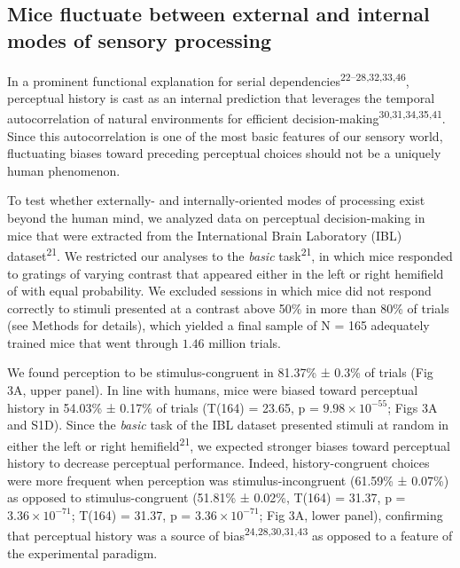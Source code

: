 \documentclass[
]{article}
\begin{document}
\hypertarget{mice-fluctuate-between-external-and-internal-modes-of-sensory-processing}{%
\subsection{Mice fluctuate between external and internal modes of
sensory
processing}\label{mice-fluctuate-between-external-and-internal-modes-of-sensory-processing}}

In a prominent functional explanation for serial
dependencies\textsuperscript{22--28,32,33,46}, perceptual history is
cast as an internal prediction that leverages the temporal
autocorrelation of natural environments for efficient
decision-making\textsuperscript{30,31,34,35,41}. Since this
autocorrelation is one of the most basic features of our sensory world,
fluctuating biases toward preceding perceptual choices should not be a
uniquely human phenomenon.

To test whether externally- and internally-oriented modes of processing
exist beyond the human mind, we analyzed data on perceptual
decision-making in mice that were extracted from the International Brain
Laboratory (IBL) dataset\textsuperscript{21}. We restricted our analyses
to the \emph{basic} task\textsuperscript{21}, in which mice responded to
gratings of varying contrast that appeared either in the left or right
hemifield of with equal probability. We excluded sessions in which mice
did not respond correctly to stimuli presented at a contrast above 50\%
in more than 80\% of trials (see Methods for details), which yielded a
final sample of N = 165 adequately trained mice that went through
\(1.46\) million trials.

We found perception to be stimulus-congruent in 81.37\% ± 0.3\% of
trials (Fig 3A, upper panel). In line with humans, mice were biased
toward perceptual history in 54.03\% ± 0.17\% of trials (T(164) = 23.65,
p = \(\ensuremath{9.98\times 10^{-55}}\); Figs 3A and S1D). Since the \emph{basic} task of the IBL dataset presented
stimuli at random in either the left or right
hemifield\textsuperscript{21}, we expected stronger biases toward
perceptual history to decrease perceptual performance. Indeed,
history-congruent choices were more frequent when perception was
stimulus-incongruent (61.59\% ± 0.07\%) as opposed to stimulus-congruent
(51.81\% ± 0.02\%, T(164) = 31.37, p =
\(\ensuremath{3.36\times 10^{-71}}\); T(164) = 31.37, p =
\(\ensuremath{3.36\times 10^{-71}}\); Fig 3A, lower panel),
confirming that perceptual history was a source of
bias\textsuperscript{24,28,30,31,43} as opposed to a feature of the
experimental paradigm.
\end{document}
